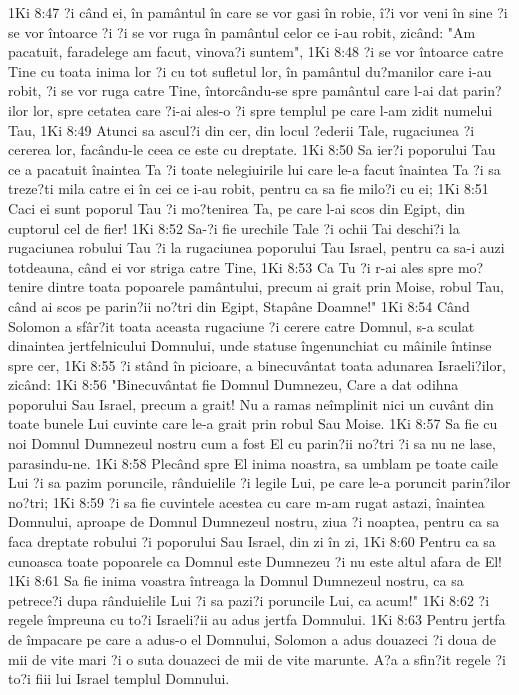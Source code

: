 1Ki 8:47  ?i când ei, în pamântul în care se vor gasi în robie, î?i vor veni în sine ?i se vor întoarce ?i ?i se vor ruga în pamântul celor ce i-au robit, zicând: "Am pacatuit, faradelege am facut, vinova?i suntem",
1Ki 8:48  ?i se vor întoarce catre Tine cu toata inima lor ?i cu tot sufletul lor, în pamântul du?manilor care i-au robit, ?i se vor ruga catre Tine, întorcându-se spre pamântul care l-ai dat parin?ilor lor, spre cetatea care ?i-ai ales-o ?i spre templul pe care l-am zidit numelui Tau,
1Ki 8:49  Atunci sa ascul?i din cer, din locul ?ederii Tale, rugaciunea ?i cererea lor, facându-le ceea ce este cu dreptate.
1Ki 8:50  Sa ier?i poporului Tau ce a pacatuit înaintea Ta ?i toate nelegiuirile lui care le-a facut înaintea Ta ?i sa treze?ti mila catre ei în cei ce i-au robit, pentru ca sa fie milo?i cu ei;
1Ki 8:51  Caci ei sunt poporul Tau ?i mo?tenirea Ta, pe care l-ai scos din Egipt, din cuptorul cel de fier!
1Ki 8:52  Sa-?i fie urechile Tale ?i ochii Tai deschi?i la rugaciunea robului Tau ?i la rugaciunea poporului Tau Israel, pentru ca sa-i auzi totdeauna, când ei vor striga catre Tine,
1Ki 8:53  Ca Tu ?i r-ai ales spre mo?tenire dintre toata popoarele pamântului, precum ai grait prin Moise, robul Tau, când ai scos pe parin?ii no?tri din Egipt, Stapâne Doamne!"
1Ki 8:54  Când Solomon a sfâr?it toata aceasta rugaciune ?i cerere catre Domnul, s-a sculat dinaintea jertfelnicului Domnului, unde statuse îngenunchiat cu mâinile întinse spre cer,
1Ki 8:55  ?i stând în picioare, a binecuvântat toata adunarea Israeli?ilor, zicând:
1Ki 8:56  "Binecuvântat fie Domnul Dumnezeu, Care a dat odihna poporului Sau Israel, precum a grait! Nu a ramas neîmplinit nici un cuvânt din toate bunele Lui cuvinte care le-a grait prin robul Sau Moise.
1Ki 8:57  Sa fie cu noi Domnul Dumnezeul nostru cum a fost El cu parin?ii no?tri ?i sa nu ne lase, parasindu-ne.
1Ki 8:58  Plecând spre El inima noastra, sa umblam pe toate caile Lui ?i sa pazim poruncile, rânduielile ?i legile Lui, pe care le-a poruncit parin?ilor no?tri;
1Ki 8:59  ?i sa fie cuvintele acestea cu care m-am rugat astazi, înaintea Domnului, aproape de Domnul Dumnezeul nostru, ziua ?i noaptea, pentru ca sa faca dreptate robului ?i poporului Sau Israel, din zi în zi,
1Ki 8:60  Pentru ca sa cunoasca toate popoarele ca Domnul este Dumnezeu ?i nu este altul afara de El!
1Ki 8:61  Sa fie inima voastra întreaga la Domnul Dumnezeul nostru, ca sa petrece?i dupa rânduielile Lui ?i sa pazi?i poruncile Lui, ca acum!"
1Ki 8:62  ?i regele împreuna cu to?i Israeli?ii au adus jertfa Domnului.
1Ki 8:63  Pentru jertfa de împacare pe care a adus-o el Domnului, Solomon a adus douazeci ?i doua de mii de vite mari ?i o suta douazeci de mii de vite marunte. A?a a sfin?it regele ?i to?i fiii lui Israel templul Domnului.
